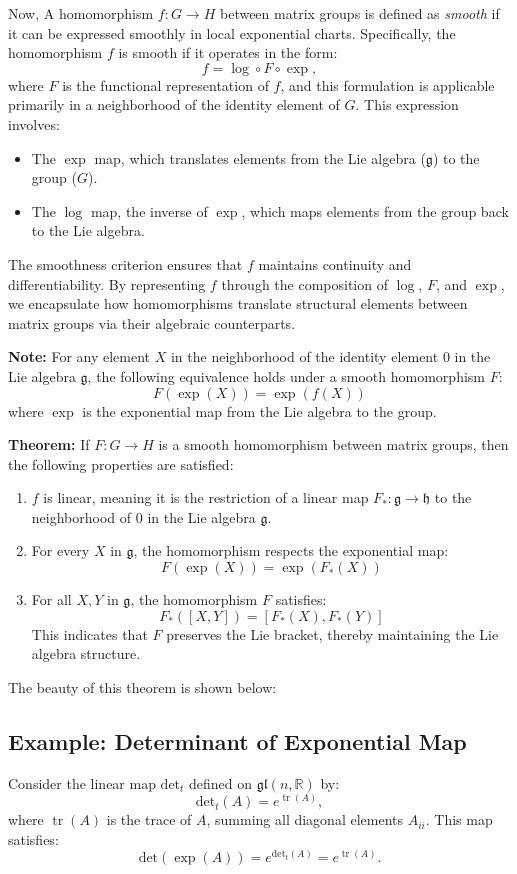 \documentclass{article}
\begin{document}
Now, A homomorphism \( f: G \rightarrow H \) between matrix groups is defined as \emph{smooth} if it can be expressed smoothly in local exponential charts. Specifically, the homomorphism \( f \) is smooth if it operates in the form:
\[
f = \log \circ F \circ \exp,
\]
where \( F \) is the functional representation of \( f \), and this formulation is applicable primarily in a neighborhood of the identity element of \( G \). This expression involves:
\begin{itemize}
  \item The \(\exp\) map, which translates elements from the Lie algebra (\(\mathfrak{g}\)) to the group (\(G\)).
  \item The \(\log\) map, the inverse of \(\exp\), which maps elements from the group back to the Lie algebra.
\end{itemize}

The smoothness criterion ensures that \( f \) maintains continuity and differentiability. By representing \( f \) through the composition of \(\log\), \(F\), and \(\exp\), we encapsulate how homomorphisms translate structural elements between matrix groups via their algebraic counterparts. 

\textbf{Note:}
For any element \(X\) in the neighborhood of the identity element \(0\) in the Lie algebra \(\mathfrak{g}\), the following equivalence holds under a smooth homomorphism \( F \):
\[
F(\exp(X)) = \exp(f(X))
\]
where \( \exp \) is the exponential map from the Lie algebra to the group.

\textbf{Theorem:}
If \( F: G \to H \) is a smooth homomorphism between matrix groups, then the following properties are satisfied:
\begin{enumerate}
    \item \( f \) is linear, meaning it is the restriction of a linear map \( F_*: \mathfrak{g} \to \mathfrak{h} \) to the neighborhood of \( 0 \) in the Lie algebra \(\mathfrak{g}\).
    \item For every \( X \) in \(\mathfrak{g}\), the homomorphism respects the exponential map:
    \[
    F(\exp(X)) = \exp(F_*(X)) 
    \]
    \item For all \( X, Y \) in \(\mathfrak{g}\), the homomorphism \( F \) satisfies:
    \[
    F_*([X, Y]) = [F_*(X), F_*(Y)]
    \]
    This indicates that \( F \) preserves the Lie bracket, thereby maintaining the Lie algebra structure.
\end{enumerate}

The beauty of this theorem is shown below: 
\subsection*{Example: Determinant of Exponential Map}
Consider the linear map \(\text{det}_t\) defined on \( \mathfrak{gl}(n, \mathbb{R}) \) by:
\[
\text{det}_t(A) = e^{\operatorname{tr}(A)},
\]
where \( \operatorname{tr}(A) \) is the trace of \( A \), summing all diagonal elements \( A_{ii} \). This map satisfies:
\[
\text{det}(\exp(A)) = e^{\text{det}_t(A)} = e^{\operatorname{tr}(A)}.
\]
\end{document}
